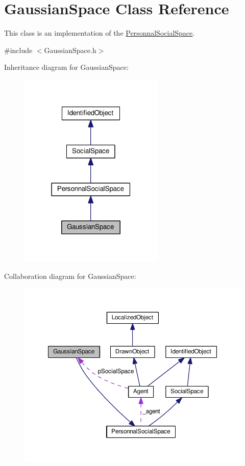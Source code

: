 \hypertarget{classGaussianSpace}{}\section{Gaussian\+Space Class Reference}
\label{classGaussianSpace}


This class is an implementation of the \hyperlink{classPersonnalSocialSpace}{Personnal\+Social\+Space}.  




{\ttfamily \#include $<$Gaussian\+Space.\+h$>$}



Inheritance diagram for Gaussian\+Space\+:\nopagebreak
\begin{figure}[H]
\begin{center}
\leavevmode
\includegraphics[width=195pt]{classGaussianSpace__inherit__graph}
\end{center}
\end{figure}


Collaboration diagram for Gaussian\+Space\+:\nopagebreak
\begin{figure}[H]
\begin{center}
\leavevmode
\includegraphics[width=350pt]{classGaussianSpace__coll__graph}
\end{center}
\end{figure}
